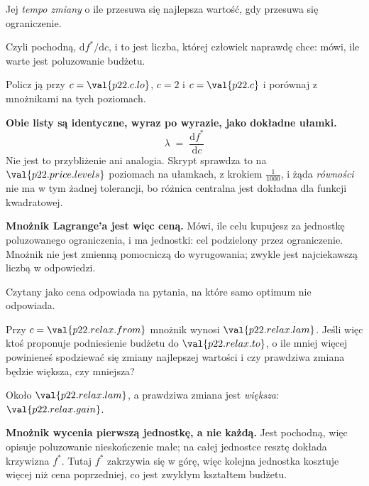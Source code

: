 \begin{fr}
\begin{ansblock}
Jej \emph{tempo zmiany} \dash{} o ile przesuwa się najlepsza wartość, gdy
przesuwa się ograniczenie.
\end{ansblock}

Czyli pochodną, $\mathrm{d}f^{*}/\mathrm{d}c$, i to jest liczba, której
człowiek naprawdę chce: mówi, ile warte jest poluzowanie budżetu.

Policz ją przy $c = \val{p22.c.lo}$, $c = \num{2}$ i $c = \val{p22.c}$ i
porównaj
z mnożnikami na tych poziomach.

\end{fr}

\begin{fr}
\begin{note}
\textbf{Obie listy są identyczne, wyraz po wyrazie, jako dokładne ułamki.}
\[ \lambda \;=\; \frac{\mathrm{d}f^{*}}{\mathrm{d}c} \]
Nie jest to przybliżenie ani analogia. Skrypt sprawdza to na
$\val{p22.price.levels}$ poziomach na ułamkach, z krokiem $\frac{1}{1000}$, i
żąda \emph{równości} \dash{} nie ma w tym żadnej tolerancji, bo różnica
centralna jest dokładna dla funkcji kwadratowej.

\textbf{Mnożnik Lagrange'a jest więc ceną.} Mówi, ile celu kupujesz za jednostkę
poluzowanego ograniczenia, i ma jednostki: cel podzielony przez ograniczenie.
Mnożnik nie jest zmienną pomocniczą do wyrugowania; zwykle jest najciekawszą
liczbą w odpowiedzi.
\end{note}
\end{fr}

\begin{fr}
Czytany jako cena odpowiada na pytania, na które samo optimum nie odpowiada.

Przy $c = \val{p22.relax.from}$ mnożnik wynosi $\val{p22.relax.lam}$. Jeśli więc
ktoś proponuje podniesienie budżetu do $\val{p22.relax.to}$, o ile mniej więcej
powinieneś spodziewać się zmiany najlepszej wartości \dash{} i czy prawdziwa
zmiana będzie większa, czy mniejsza?
\nextframe
\end{fr}

\begin{fr}
\begin{ansblock}
Około $\val{p22.relax.lam}$, a prawdziwa zmiana jest \emph{większa}:
$\val{p22.relax.gain}$.
\end{ansblock}

\textbf{Mnożnik wycenia pierwszą jednostkę, a nie każdą.} Jest pochodną, więc
opisuje poluzowanie nieskończenie małe; na całej jednostce resztę dokłada
krzywizna $f^{*}$. Tutaj $f^{*}$ zakrzywia się w górę, więc kolejna jednostka
kosztuje więcej niż cena poprzedniej, co jest zwykłym kształtem budżetu.

\end{fr}

